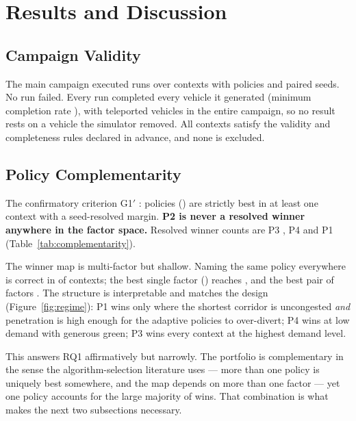 \section{Results and Discussion}
\label{sec:results}

\subsection{Campaign Validity}

The main campaign executed \NumRunsMain{} runs over \NumContexts{} contexts with
\NumPolicies{} policies and \NumSeeds{} paired seeds. No run failed. Every run
completed every vehicle it generated (minimum completion rate
\NumMinCompletion{}), with \NumTeleports{} teleported vehicles in the entire
campaign, so no result rests on a vehicle the simulator removed. All
\NumContextsAnalysed{} contexts satisfy the validity and completeness rules
declared in advance, and none is excluded.

\subsection{Policy Complementarity}
\label{sec:complementarity}

The confirmatory criterion G1$'$ \NumGOneVerdict{}: \NumGOneNPolicies{} policies
(\NumGOnePolicies) are strictly best in at least one context with a
seed-resolved margin. \textbf{P2 is never a resolved winner anywhere in the
factor space.} Resolved winner counts are P3 \NumWinResPThree{}, P4
\NumWinResPFour{} and P1 \NumWinResPOne{} (Table~\ref{tab:complementarity}).

The winner map is multi-factor but shallow. Naming the same policy everywhere is
correct in \NumWinMapConst{} of contexts; the best single factor
(\NumWinMapOneFactor) reaches \NumWinMapOne{}, and the best pair of factors
\NumWinMapTwo{}. The structure is interpretable and matches the design
(Figure~\ref{fig:regime}): P1 wins only where the shortest corridor is
uncongested \emph{and} penetration is high enough for the adaptive policies to
over-divert; P4 wins at low demand with generous green; P3 wins every context
at the highest demand level.

This answers RQ1 affirmatively but narrowly. The portfolio is complementary in
the sense the algorithm-selection literature uses --- more than one policy is
uniquely best somewhere, and the map depends on more than one factor --- yet one
policy accounts for the large majority of wins. That combination is what makes
the next two subsections necessary.

